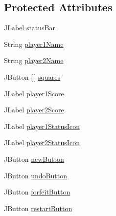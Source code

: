 \subsection*{Protected Attributes}
\begin{DoxyCompactItemize}
\item 
J\+Label \mbox{\hyperlink{class_chess_g_u_i_a02cdba2c0212fa5482194e1318d5089e}{status\+Bar}}
\item 
String \mbox{\hyperlink{class_chess_g_u_i_aef271c3a01601e04699262f1daa6af84}{player1\+Name}}
\item 
String \mbox{\hyperlink{class_chess_g_u_i_a4541cbd521e82470b1d2f488536862ba}{player2\+Name}}
\item 
J\+Button \mbox{[}$\,$\mbox{]} \mbox{\hyperlink{class_chess_g_u_i_a9f139dfcfa39c07e122f5d32ed121e02}{squares}}
\item 
J\+Label \mbox{\hyperlink{class_chess_g_u_i_a2afb1abff4f8b7821a3ccb5793f558be}{player1\+Score}}
\item 
J\+Label \mbox{\hyperlink{class_chess_g_u_i_a1a24599c1aad2157d35333adb75befd7}{player2\+Score}}
\item 
J\+Label \mbox{\hyperlink{class_chess_g_u_i_a134616c2479f91dae17f5a25f3b242eb}{player1\+Status\+Icon}}
\item 
J\+Label \mbox{\hyperlink{class_chess_g_u_i_aea612755b5acb50aa59dac728033aa7f}{player2\+Status\+Icon}}
\item 
J\+Button \mbox{\hyperlink{class_chess_g_u_i_ae3a5127a34ad9aaac6b4779f9e70968c}{new\+Button}}
\item 
J\+Button \mbox{\hyperlink{class_chess_g_u_i_a9ca5fa7a1828101912aa1774fa2f353c}{undo\+Button}}
\item 
J\+Button \mbox{\hyperlink{class_chess_g_u_i_a4ab3b8b5fa925942bb7abf75cf42094d}{forfeit\+Button}}
\item 
J\+Button \mbox{\hyperlink{class_chess_g_u_i_ac7457f4424c7e1fd5450cd63f61a5276}{restart\+Button}}
\end{DoxyCompactItemize}


